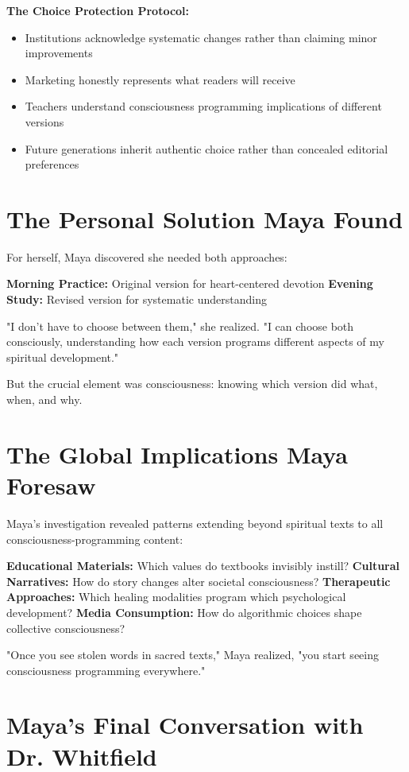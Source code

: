 \documentclass[11pt,twoside]{book}
\begin{document}
\textbf{\textbf{The Choice Protection Protocol:}}
\begin{itemize}
\item Institutions acknowledge systematic changes rather than claiming minor improvements
\item Marketing honestly represents what readers will receive
\item Teachers understand consciousness programming implications of different versions
\item Future generations inherit authentic choice rather than concealed editorial preferences
\end{itemize}
\section*{The Personal Solution Maya Found}
\label{sec:orgb8e0df6}

For herself, Maya discovered she needed both approaches:

\textbf{\textbf{Morning Practice:}} Original version for heart-centered devotion
\textbf{\textbf{Evening Study:}} Revised version for systematic understanding

"I don't have to choose between them," she realized. "I can choose both consciously, understanding how each version programs different aspects of my spiritual development."

But the crucial element was consciousness: knowing which version did what, when, and why.
\section*{The Global Implications Maya Foresaw}
\label{sec:org7c5596d}

Maya's investigation revealed patterns extending beyond spiritual texts to all consciousness-programming content:

\textbf{\textbf{Educational Materials:}} Which values do textbooks invisibly instill?
\textbf{\textbf{Cultural Narratives:}} How do story changes alter societal consciousness?
\textbf{\textbf{Therapeutic Approaches:}} Which healing modalities program which psychological development?
\textbf{\textbf{Media Consumption:}} How do algorithmic choices shape collective consciousness?

"Once you see stolen words in sacred texts," Maya realized, "you start seeing consciousness programming everywhere."
\section*{Maya's Final Conversation with Dr. Whitfield}
\label{sec:org5724f66}
\end{document}
